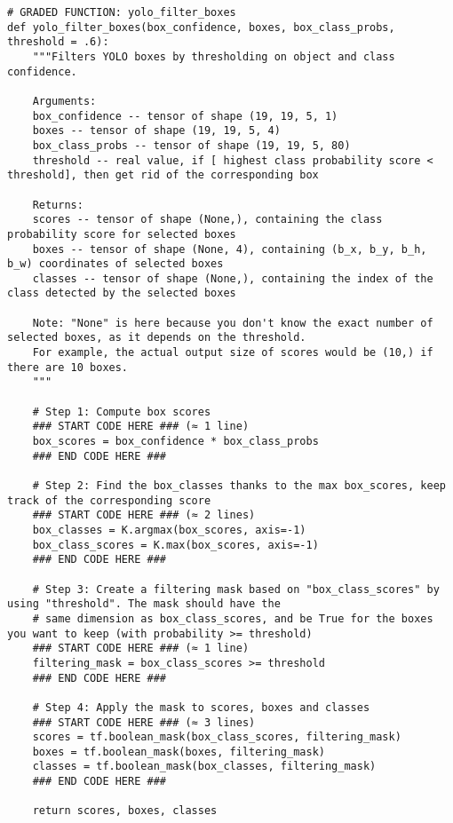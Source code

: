 \begin{verbatim}
# GRADED FUNCTION: yolo_filter_boxes
def yolo_filter_boxes(box_confidence, boxes, box_class_probs, threshold = .6):
    """Filters YOLO boxes by thresholding on object and class confidence.
    
    Arguments:
    box_confidence -- tensor of shape (19, 19, 5, 1)
    boxes -- tensor of shape (19, 19, 5, 4)
    box_class_probs -- tensor of shape (19, 19, 5, 80)
    threshold -- real value, if [ highest class probability score < threshold], then get rid of the corresponding box
    
    Returns:
    scores -- tensor of shape (None,), containing the class probability score for selected boxes
    boxes -- tensor of shape (None, 4), containing (b_x, b_y, b_h, b_w) coordinates of selected boxes
    classes -- tensor of shape (None,), containing the index of the class detected by the selected boxes
    
    Note: "None" is here because you don't know the exact number of selected boxes, as it depends on the threshold. 
    For example, the actual output size of scores would be (10,) if there are 10 boxes.
    """
    
    # Step 1: Compute box scores
    ### START CODE HERE ### (≈ 1 line)
    box_scores = box_confidence * box_class_probs
    ### END CODE HERE ###
    
    # Step 2: Find the box_classes thanks to the max box_scores, keep track of the corresponding score
    ### START CODE HERE ### (≈ 2 lines)
    box_classes = K.argmax(box_scores, axis=-1)
    box_class_scores = K.max(box_scores, axis=-1)
    ### END CODE HERE ###
    
    # Step 3: Create a filtering mask based on "box_class_scores" by using "threshold". The mask should have the
    # same dimension as box_class_scores, and be True for the boxes you want to keep (with probability >= threshold)
    ### START CODE HERE ### (≈ 1 line)
    filtering_mask = box_class_scores >= threshold
    ### END CODE HERE ###
    
    # Step 4: Apply the mask to scores, boxes and classes
    ### START CODE HERE ### (≈ 3 lines)
    scores = tf.boolean_mask(box_class_scores, filtering_mask)
    boxes = tf.boolean_mask(boxes, filtering_mask)
    classes = tf.boolean_mask(box_classes, filtering_mask)
    ### END CODE HERE ###
    
    return scores, boxes, classes
\end{verbatim}



